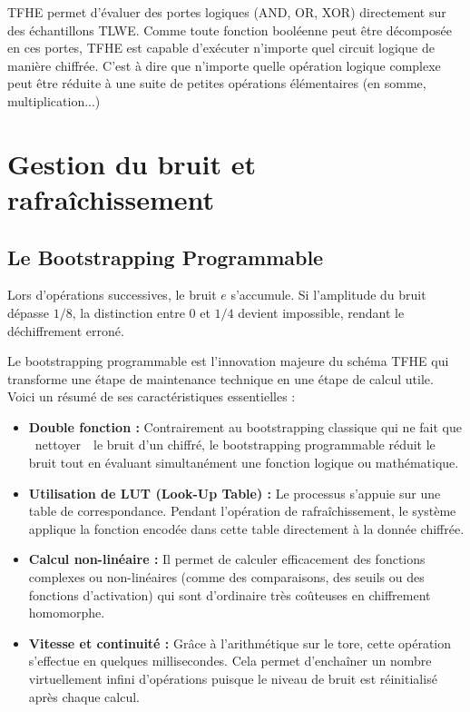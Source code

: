 TFHE permet d’évaluer des portes logiques (AND, OR, XOR) directement sur des échantillons TLWE. Comme toute fonction booléenne peut être décomposée en ces portes, TFHE est capable d'exécuter n'importe quel circuit logique de manière chiffrée. C'est à dire que n'importe quelle opération logique complexe peut être réduite à une suite de petites opérations élémentaires (en somme, multiplication...)

\section{Gestion du bruit et rafraîchissement}

\subsection{Le Bootstrapping Programmable}

Lors d’opérations successives, le bruit $e$ s'accumule. Si l'amplitude du bruit dépasse $1/8$, la distinction entre $0$ et $1/4$ devient impossible, rendant le déchiffrement erroné.

Le bootstrapping programmable est l'innovation majeure du schéma TFHE qui transforme une étape de maintenance technique en une étape de calcul utile. Voici un résumé de ses caractéristiques essentielles :

\begin{itemize}
    \item \textbf{Double fonction :} Contrairement au bootstrapping classique qui ne fait que \guillemotleft~nettoyer~\guillemotright\ le bruit d'un chiffré, le bootstrapping programmable réduit le bruit tout en évaluant simultanément une fonction logique ou mathématique.
    \item \textbf{Utilisation de LUT (Look-Up Table) :} Le processus s'appuie sur une table de correspondance. Pendant l'opération de rafraîchissement, le système applique la fonction encodée dans cette table directement à la donnée chiffrée.
    \item \textbf{Calcul non-linéaire :} Il permet de calculer efficacement des fonctions complexes ou non-linéaires (comme des comparaisons, des seuils ou des fonctions d'activation) qui sont d'ordinaire très coûteuses en chiffrement homomorphe.
    \item \textbf{Vitesse et continuité :} Grâce à l'arithmétique sur le tore, cette opération s'effectue en quelques millisecondes. Cela permet d'enchaîner un nombre virtuellement infini d'opérations puisque le niveau de bruit est réinitialisé après chaque calcul.
\end{itemize}

